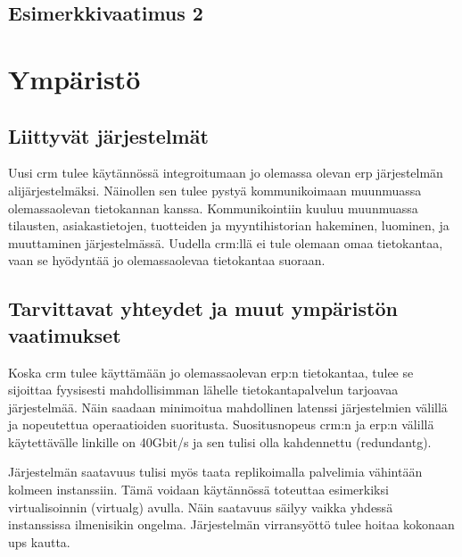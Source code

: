     \subsection{Esimerkkivaatimus 2}





\section{Ympäristö}     %
    \subsection{Liittyvät järjestelmät}     %
        Uusi \gls{crm} tulee käytännössä integroitumaan jo olemassa olevan \gls{erp} järjestelmän alijärjestelmäksi. Näinollen sen tulee pystyä kommunikoimaan muunmuassa olemassaolevan tietokannan kanssa. Kommunikointiin kuuluu muunmuassa tilausten, asiakastietojen, tuotteiden ja myyntihistorian hakeminen, luominen, ja muuttaminen järjestelmässä. Uudella \gls{crm}:llä ei tule olemaan omaa tietokantaa, vaan se hyödyntää jo olemassaolevaa tietokantaa suoraan. 


    \subsection{Tarvittavat yhteydet ja muut ympäristön vaatimukset}  %
        Koska \gls{crm} tulee käyttämään jo olemassaolevan \gls{erp}:n tietokantaa, tulee se sijoittaa fyysisesti mahdollisimman lähelle tietokantapalvelun tarjoavaa järjestelmää. Näin saadaan minimoitua mahdollinen latenssi järjestelmien välillä ja nopeutettua operaatioiden suoritusta. Suositusnopeus \gls{crm}:n ja \gls{erp}:n välillä käytettävälle linkille on 40Gbit/s ja sen tulisi olla kahdennettu (\gls{redundantg}). 

        Järjestelmän saatavuus tulisi myös taata replikoimalla palvelimia vähintään kolmeen instanssiin. Tämä voidaan käytännössä toteuttaa esimerkiksi virtualisoinnin (\gls{virtualg}) avulla. Näin saatavuus säilyy vaikka yhdessä instanssissa ilmenisikin ongelma. Järjestelmän virransyöttö tulee hoitaa kokonaan \gls{ups} kautta. 

